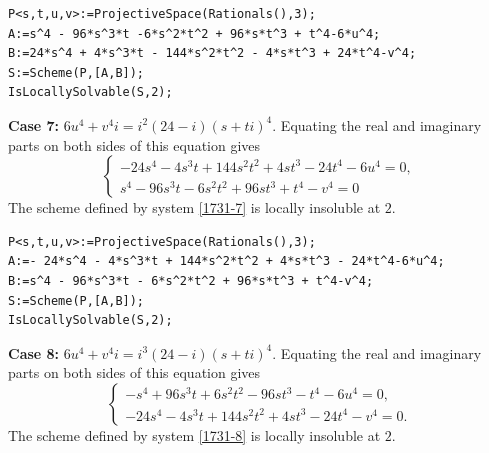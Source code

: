 \documentclass[a4paper,12pt,english,reqno]{amsart}
\begin{document}
\begin{lstlisting}
P<s,t,u,v>:=ProjectiveSpace(Rationals(),3);
A:=s^4 - 96*s^3*t -6*s^2*t^2 + 96*s*t^3 + t^4-6*u^4;
B:=24*s^4 + 4*s^3*t - 144*s^2*t^2 - 4*s*t^3 + 24*t^4-v^4;
S:=Scheme(P,[A,B]);
IsLocallySolvable(S,2);
\end{lstlisting}

{\bf Case 7:} $6u^4+v^4i=i^2(24-i)(s+ti)^4$. Equating the real and imaginary parts on both sides of this equation gives
\begin{equation}\label{1731-7}
\begin{cases}
-24s^4 - 4s^3t + 144s^2t^2 + 4st^3 - 24t^4 - 6u^4=0,\\
s^4 - 96s^3t - 6s^2t^2 + 96st^3 + t^4 - v^4=0
\end{cases}
\end{equation}
The scheme defined by system \eqref{1731-7} is locally insoluble at $2$.


\begin{lstlisting}
P<s,t,u,v>:=ProjectiveSpace(Rationals(),3);
A:=- 24*s^4 - 4*s^3*t + 144*s^2*t^2 + 4*s*t^3 - 24*t^4-6*u^4;
B:=s^4 - 96*s^3*t - 6*s^2*t^2 + 96*s*t^3 + t^4-v^4;
S:=Scheme(P,[A,B]);
IsLocallySolvable(S,2);
\end{lstlisting}

{\bf Case 8:} $6u^4+v^4i=i^3(24-i)(s+ti)^4$. Equating the real and imaginary parts on both sides of this equation gives
\begin{equation}\label{1731-8}
\begin{cases}
-s^4 + 96s^3t + 6s^2t^2 - 96st^3 - t^4 - 6u^4=0,\\
-24s^4 - 4s^3t + 144s^2t^2 + 4st^3 - 24t^4 - v^4=0.
\end{cases}
\end{equation}
The scheme defined by system \eqref{1731-8} is locally insoluble at $2$.

\end{document}
